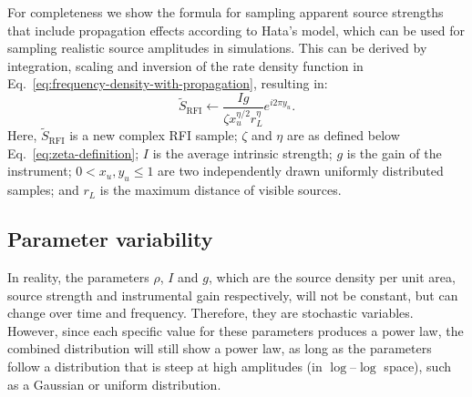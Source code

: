 \documentclass[useAMS,usenatbib]{mn2e}
\begin{document}

For completeness we show the formula for sampling apparent source strengths that include propagation effects according to Hata's model, which can be used for sampling realistic source amplitudes in simulations. This can be derived by integration, scaling and inversion of the rate density function in Eq.~\eqref{eq:frequency-density-with-propagation}, resulting in:
\begin{equation} \label{eq:sample-with-propagation}
\tilde{S}_{\textrm{RFI}} \leftarrow \frac{I g}{\zeta x_u^{\eta/2} r_L^\eta} e^{i 2 \pi y_u}.
\end{equation}
Here, $\tilde{S}_{\textrm{RFI}}$ is a new complex RFI sample; $\zeta$ and $\eta$ are as defined below Eq.~\eqref{eq:zeta-definition}; $I$ is the average intrinsic strength; $g$ is the gain of the instrument; $0 < x_u,y_u \le 1$ are two independently drawn uniformly distributed samples; and $r_L$ is the maximum distance of visible sources.

\subsection{Parameter variability} \label{sec:parameter-variability}
In reality, the parameters $\rho$, $I$ and $g$, which are the source density per unit area, source strength and instrumental gain respectively, will not be constant, but can change over time and frequency. Therefore, they are stochastic variables. However, since each specific value for these parameters produces a power law, the combined distribution will still show a power law, as long as the parameters follow a distribution that is steep at high amplitudes (in $\log$--$\log$ space), such as a Gaussian or uniform distribution.
\end{document}
